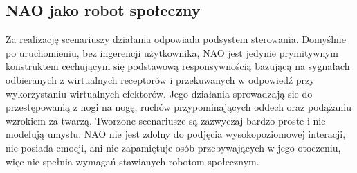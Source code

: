 \subsection{NAO jako robot społeczny}

Za realizację scenariuszy działania odpowiada podsystem sterowania. Domyślnie po uruchomieniu, bez ingerencji użytkownika, NAO jest jedynie prymitywnym konstruktem cechującym się podstawową responsywnością bazującą na sygnałach odbieranych z wirtualnych receptorów i przekuwanych w odpowiedź przy wykorzystaniu wirtualnych efektorów. Jego działania sprowadzają sie do przestępowanią z nogi na nogę, ruchów przypominających oddech oraz podążaniu wzrokiem za twarzą. Tworzone scenariusze są zazwyczaj bardzo proste i nie modelują umysłu. NAO nie jest zdolny do podjęcia wysokopoziomowej interacji, nie posiada emocji, ani nie zapamiętuje osób przebywających w jego otoczeniu, więc nie spełnia wymagań stawianych robotom społecznym.

